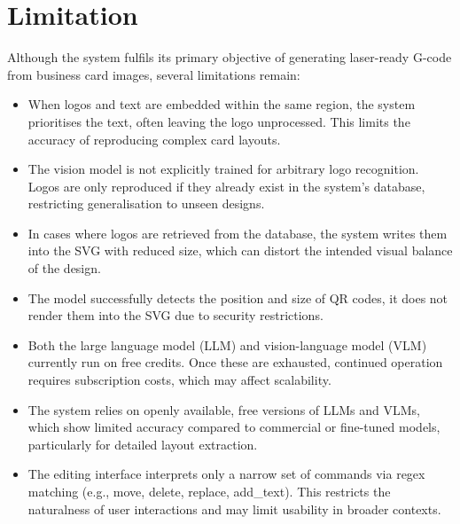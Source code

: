 \section{Limitation}
Although the system fulfils its primary objective of generating laser-ready G-code from business card images, several limitations remain:
\begin{itemize}
	\item When logos and text are embedded within the same region, the system prioritises the text, often leaving the logo unprocessed. This limits the accuracy of reproducing complex card layouts.
	\item The vision model is not explicitly trained for arbitrary logo recognition. Logos are only reproduced if they already exist in the system’s database, restricting generalisation to unseen designs.
	\item In cases where logos are retrieved from the database, the system writes them into the SVG with reduced size, which can distort the intended visual balance of the design.
	\item The model successfully detects the position and size of QR codes, it does not render them into the SVG due to security restrictions.
	\item Both the large language model (LLM) and vision-language model (VLM) currently run on free credits. Once these are exhausted, continued operation requires subscription costs, which may affect scalability.
	\item The system relies on openly available, free versions of LLMs and VLMs, which show limited accuracy compared to commercial or fine-tuned models, particularly for detailed layout extraction.
	\item The editing interface interprets only a narrow set of commands via regex matching (e.g., move, delete, replace, add\_text). This restricts the naturalness of user interactions and may limit usability in broader contexts.
\end{itemize}


